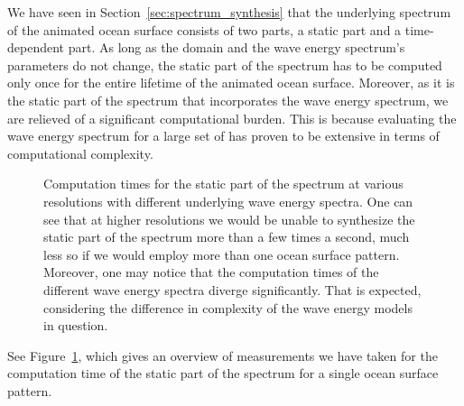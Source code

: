 We have seen in Section~\ref{sec:spectrum_synthesis} that the underlying
spectrum of the animated ocean surface consists of two parts, a static part
and a time-dependent part.
As long as the \wavevector domain and the wave energy spectrum's parameters do
not change, the static part of the spectrum has to be computed only once for
the entire lifetime of the animated ocean surface.
Moreover, as it is the static part of the spectrum that incorporates the wave
energy spectrum, we are relieved of a significant computational burden.
This is because evaluating the wave energy spectrum for a large set of
\wavevectors has proven to be extensive in terms of computational complexity.
%
\begin{figure}
\centering
\mydata
{}
\caption[Computation times for the static part of the spectrum at various
resolutions with different underlying wave energy spectra.]{
Computation times for the static part of the spectrum at various
resolutions with different underlying wave energy spectra.
One can see that at higher resolutions we would be unable to synthesize the
static part of the spectrum more than a few times a second, much less so if we
would employ more than one ocean surface pattern.
Moreover, one may notice that the computation times of the different wave
energy spectra diverge significantly. That is expected, considering
the difference in complexity of the wave energy models in question.
}
\label{fig:results:h0}
\end{figure}
%
See Figure~\ref{fig:results:h0}, which gives an overview of measurements we
have taken for the computation time of the static part of the spectrum for a
single ocean surface pattern.

